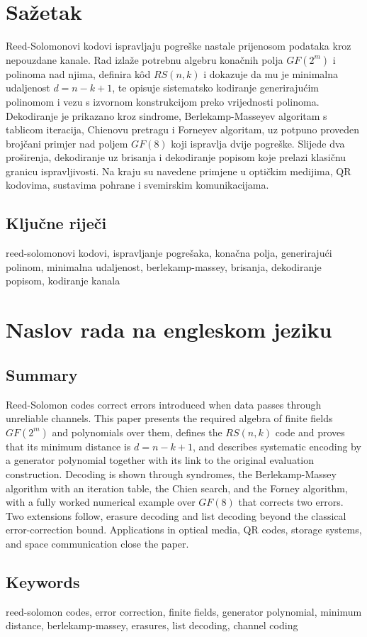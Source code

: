 \documentclass{mathos}
\begin{document}
\chapter*{Sažetak}

Reed-Solomonovi kodovi ispravljaju pogreške nastale prijenosom podataka kroz nepouzdane kanale. Rad izlaže potrebnu algebru konačnih polja $GF(2^m)$ i polinoma nad njima, definira kôd $RS(n,k)$ i dokazuje da mu je minimalna udaljenost $d = n-k+1$, te opisuje sistematsko kodiranje generirajućim polinomom i vezu s izvornom konstrukcijom preko vrijednosti polinoma. Dekodiranje je prikazano kroz sindrome, Berlekamp-Masseyev algoritam s tablicom iteracija, Chienovu pretragu i Forneyev algoritam, uz potpuno proveden brojčani primjer nad poljem $GF(8)$ koji ispravlja dvije pogreške. Slijede dva proširenja, dekodiranje uz brisanja i dekodiranje popisom koje prelazi klasičnu granicu ispravljivosti. Na kraju su navedene primjene u optičkim medijima, QR kodovima, sustavima pohrane i svemirskim komunikacijama.

\section*{Ključne riječi}

reed-solomonovi kodovi, ispravljanje pogrešaka, konačna polja, generirajući polinom, minimalna udaljenost, berlekamp-massey, brisanja, dekodiranje popisom, kodiranje kanala


\chapter*{Naslov rada na engleskom jeziku}

\section*{Summary}

Reed-Solomon codes correct errors introduced when data passes through unreliable channels. This paper presents the required algebra of finite fields $GF(2^m)$ and polynomials over them, defines the $RS(n,k)$ code and proves that its minimum distance is $d = n-k+1$, and describes systematic encoding by a generator polynomial together with its link to the original evaluation construction. Decoding is shown through syndromes, the Berlekamp-Massey algorithm with an iteration table, the Chien search, and the Forney algorithm, with a fully worked numerical example over $GF(8)$ that corrects two errors. Two extensions follow, erasure decoding and list decoding beyond the classical error-correction bound. Applications in optical media, QR codes, storage systems, and space communication close the paper.

\section*{Keywords}

reed-solomon codes, error correction, finite fields, generator polynomial, minimum distance, berlekamp-massey, erasures, list decoding, channel coding
\end{document}
